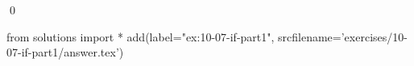 
\begin{ex}
  \label{ex:10-07-if-part1}
  
  \qed
\end{ex}
\begin{python0}
from solutions import *
add(label="ex:10-07-if-part1",
    srcfilename='exercises/10-07-if-part1/answer.tex')
\end{python0}
